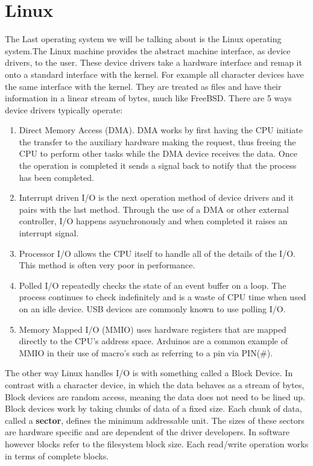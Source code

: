 \documentclass[letterpaper, 10pt, draftclsnofoot,onecolumn]{article}
\begin{document}
\section{Linux}
The Last operating system we will be talking about is the Linux operating system.The Linux machine provides the abstract machine interface, as device drivers, to the user. These device drivers take a hardware interface and remap it onto a standard interface with the kernel. For example all character devices have the same interface with the kernel. They are treated as files and have their information in a linear stream of bytes, much like FreeBSD. There are 5 ways device drivers typically operate:
\begin{enumerate}
\item Direct Memory Access (DMA). DMA works by first having the CPU initiate the transfer to the auxiliary hardware making the request, thus freeing the CPU to perform other tasks while the DMA device receives the data. Once the operation is completed it sends a signal back to notify that the process has been completed.
\item Interrupt driven I/O is the next operation method of device drivers and it pairs with the last method. Through the use of a DMA or other external controller, I/O happens asynchronously and when completed it raises an interrupt signal.
\item Processor I/O allows the CPU itself to handle all of the details of the I/O. This method is often very poor in performance.
\item Polled I/O repeatedly checks the state of an event buffer on a loop. The process continues to check indefinitely and is a waste of CPU time when used on an idle device. USB devices are commonly known to use polling I/O.
\item Memory Mapped I/O (MMIO) uses hardware registers that are mapped directly to the CPU's address space. Arduinos are a common example of MMIO in their use of macro's such as referring to a pin via PIN(\#).
\end{enumerate}
The other way Linux handles I/O is with something called a Block Device. In contrast with a character device, in which the data behaves as a stream of bytes, Block devices are random access, meaning the data does not need to be lined up. Block devices work by taking chunks of data of a fixed size. Each chunk of data, called a \textbf{sector}, defines the minimum addressable unit. The sizes of these sectors are hardware specific and are dependent of the driver developers. In software however blocks refer to the filesystem block size. Each read/write operation works in terms of complete blocks. 
\end{document}
